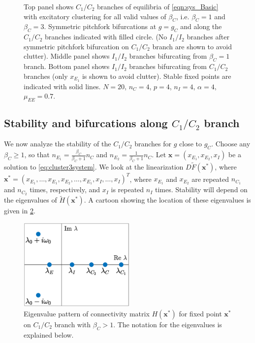 \documentclass[reqno]{siamonline190516}
\newcommand{\xvec}{\mathbf{x}}
\begin{document}
\begin{figure}
    \caption{Top panel shows $C_1/C_2$ branches of equilibria of \cref{eqn:sys_Basic} with excitatory clustering for all valid values of $\beta_C$, i.e. $\beta_C =1$ and $\beta_C=3$. Symmetric pitchfork bifurcations at $g = g_C$ and along the $C_1/C_2$ branches indicated with filled circle. (No $I_1/I_2$ branches after symmetric pitchfork bifurcation on $C_1/C_2$ branch are shown to avoid clutter). Middle panel shows $I_1/I_2$ branches bifurcating from $\beta_C = 1$ branch. Bottom panel shows $I_1/I_2$ branches bifurcating from $C_1/C_2$ branches (only $x_{E_1}$ is shown to avoid clutter). Stable fixed points are indicated with solid lines. $N = 20$, $n_C = 4$, $p = 4$, $n_I = 4$, $\alpha = 4$, $\mu_{EE} = 0.7$.}
    \label{fig:clusterBD1}
\end{figure}

\subsection{Stability and bifurcations along \texorpdfstring{$C_1/C_2$}{C1/C2} branch}

We now analyze the stability of the $C_1/C_2$ branches for $g$ close to $g_C$. Choose any $\beta_C \geq 1$, so that $n_{E_1} = \frac{\beta_C}{\beta_C+1}n_C$ and $n_{E_2} = \frac{1}{\beta_C+1}n_C$. Let $\xvec = (x_{E_1}, x_{E_2}, x_{I})$ be a solution to \cref{eq:cluster3system}. We look at the linearization $D\tilde{F}(\xvec^*)$, where $\xvec^* = (x_{E_1}, \dots, x_{E_1}, x_{E_2}, \dots, x_{E_1}, x_{I}, \dots, x_{I})^T$, where $x_{E_1}$ and $x_{E_2}$ are repeated $n_{C_1}$ and $n_{C_2}$ times, respectively, and $x_I$ is repeated $n_I$ times. Stability will depend on the eigenvalues of $\tilde{H}(\xvec^*)$. A cartoon showing the location of these eigenvalues is given in \cref{fig:HstareigEcluster}. 

\begin{figure}
    \centering
    \includegraphics[width=5.7cm]{images/eigpatternxstarEcluster.eps}
    \caption{Eigenvalue pattern of connectivity matrix $H(\xvec^*)$ for fixed point $\xvec^*$ on $C_1/C_2$ branch with $\beta_C > 1$. The notation for the eigenvalues is explained below.}
    \label{fig:HstareigEcluster}
\end{figure}
\end{document}
